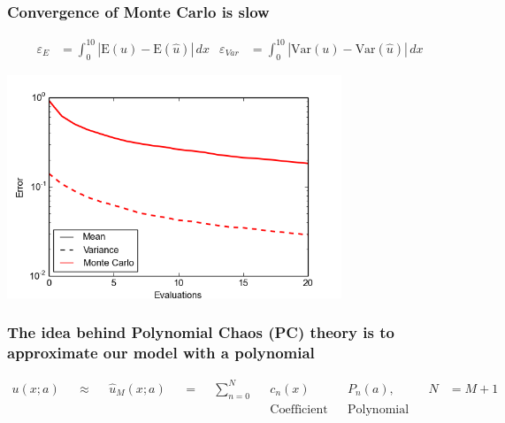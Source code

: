 \documentclass[handout]{beamer}
\newcommand{\E}[1]{\mbox{E}\!\left(#1\right)}
\newcommand{\Var}[1]{\mbox{Var}\!\left(#1\right)}
\begin{document}
\begin{frame}
  \frametitle{Convergence of Monte Carlo is slow}
  \begin{align*}
      \varepsilon_E &= \int_0^{10}|\E{u} - \E{\hat{u}}|\,dx &
      \varepsilon_{Var} &= \int_0^{10}|\Var{u} - \Var{\hat{u}}|\,dx
  \end{align*}
  \begin{center}
    \includegraphics[width=0.75\textwidth]{MC_convergence_1D_1.png}
  \end{center}
\end{frame}




\begin{frame}
  \frametitle{The idea behind Polynomial Chaos (PC) theory is to approximate our model with a polynomial}
  \begin{align*}
      u(x;a) & &\approx && \hat u_M(x;a) && =
      && \sum_{n=0}^N && c_n(x)\quad && P_n(a),\quad && N &= M+1\\
      &&  &&  &&  &&  && \text{Coefficient} && \text{Polynomial}
  \end{align*}
\end{frame}
\end{document}
